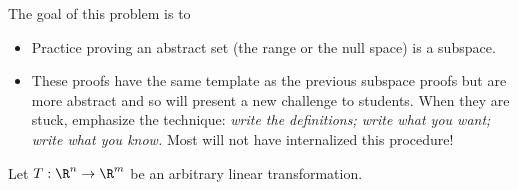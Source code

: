 	\bookonlynewpage
	\question
	\begin{annotation}
		\begin{goals}

			The goal of this problem is to
			\begin{itemize}
				\item Practice proving an abstract set (the range or the null space) is a subspace.
			\end{itemize}
		\end{goals}

		\begin{notes}
			\begin{itemize}
				\item These proofs have the same template as the previous subspace proofs but
					are more abstract and so will present a new challenge to students. When
					they are stuck, emphasize the technique: \emph{write the definitions; write what you want; 
					write what you know.} Most will not have internalized this procedure!
			\end{itemize}
		\end{notes}
	\end{annotation}
	Let $T:\R^n\to\R^m$ be an arbitrary linear transformation.
